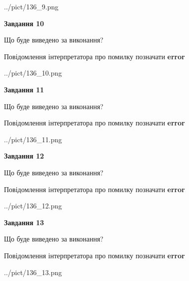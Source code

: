 \documentclass[11pt, ukrainian]{article}
\begin{document}
{\begin {large}
\begin{center}
	{../pict/136_9.png}
\end{center}
\newpage

{\begin {center}\textbf{Завдання 10}\end {center}}\par
Що буде виведено за виконання? \par
Повідомлення інтерпретатора про помилку позначати \textbf{error}

\begin{center}
	{../pict/136_10.png}
\end{center}
\newpage

{\begin {center}\textbf{Завдання 11}\end {center}}\par
Що буде виведено за виконання? \par
Повідомлення інтерпретатора про помилку позначати \textbf{error}

\begin{center}
	{../pict/136_11.png}
\end{center}
\newpage

{\begin {center}\textbf{Завдання 12}\end {center}}\par
Що буде виведено за виконання? \par
Повідомлення інтерпретатора про помилку позначати \textbf{error}

\begin{center}
	{../pict/136_12.png}
\end{center}
\newpage

{\begin {center}\textbf{Завдання 13}\end {center}}\par
Що буде виведено за виконання? \par
Повідомлення інтерпретатора про помилку позначати \textbf{error}

\begin{center}
	{../pict/136_13.png}
\end{center}
\newpage


\end{large}}
\end{document}

